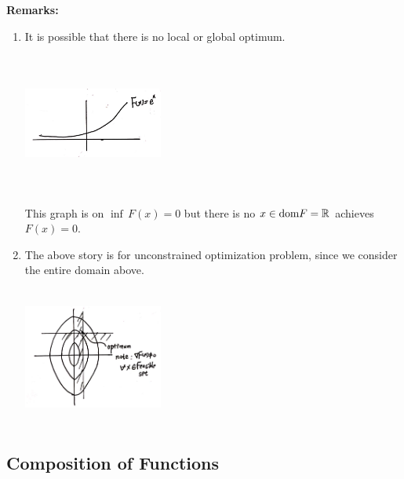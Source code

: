 \textbf{Remarks: }
\begin{enumerate}
	\item It is possible that there is no local or global optimum.
	
	\begin{marginfigure}
	\centering
	\includegraphics[width=1.8in,height=1.8in]{figures/ch08/figure1111_2.png}
	\end{marginfigure}
	
	This graph is on $\inf\, F(x) = 0$ but there is no $x\in \text{dom}F = \mathbb{R}$ achieves $F(x) = 0$.
	
	\item The above story is for unconstrained optimization problem, since we consider the entire domain above.
	
	\begin{marginfigure}
	\centering
	\includegraphics[width=1.8in,height=1.8in]{figures/ch08/figure1111_3.png}
	\end{marginfigure}
	
\end{enumerate}






\vspace{0.5cm}
\subsection{Composition of Functions}

